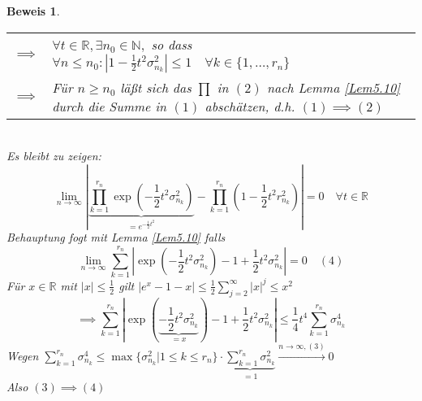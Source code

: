 \documentclass[a4paper,11pt]{book}
\newcommand{\R}{{\mathbb R}}
\newcommand{\N}{{\mathbb N}}
\def\folgt{\ensuremath{\implies}}
\theoremstyle{nonumberplain}
\newtheorem{Bew}{Beweis}
\begin{document}
\begin{Bew}
\begin{tabular}[b]{rp{}}
$\folgt$ & $\forall t\in\R, \exists n_0\in\N,$ so dass $\forall n\le n_0: |1-\frac 1 2 t^2\sigma_{n_k}^2|\le 1\quad \forall k\in\{1,\ldots, r_n\}$\\
$\folgt$ & Für $n\ge n_0$ läßt sich das $\prod$ in $(2)$ nach Lemma \ref{Lem5.10} durch die Summe in $(1)$ abschätzen, d.h. $(1)\folgt(2)$\\
\end{tabular}\\
Es bleibt zu zeigen:
$$\lim_{n\to\infty}|\underbrace{\prod_{k=1}^{r_n}\exp(-\frac 1 2 t^2\sigma_{n_k}^2)}_{=e^{-\frac 1 2 t^2}} - \prod_{k=1}^{r_n}(1-\frac 1 2 t^2 r_{n_k}^2)| = 0 \quad\forall t\in\R$$
Behauptung fogt mit Lemma \ref{Lem5.10} falls
$$\lim_{n\to\infty}\sum_{k=1}^{r_n}\left|\exp(-\frac 1 2 t^2\sigma_{n_k}^2) - 1 + \frac 1 2 t^2\sigma_{n_k}^2\right| = 0\quad (4)$$
Für $x\in\R$ mit $|x|\le\frac 1 2$ gilt $|e^x-1-x|\le\frac 1 2 \sum_{j=2}^\infty |x|^j\le x^2$
$$\folgt \sum_{k=1}^{r_n}|\exp(\underbrace{-\frac 1 2 t^2\sigma_{n_k}^2}_{=x}) - 1 + \frac 1 2 t^2\sigma_{n_k}^2|\le \frac 1 4 t^4\sum_{k=1}^{r_n}\sigma_{n_k}^4$$
Wegen $\sum_{k=1}^{r_n}\sigma_{n_k}^4\le\max\{\sigma_{n_k}^2|1\le k\le r_n\} \cdot\underbrace{\sum_{k=1}^{r_n}\sigma_{n_k}^2}_{=1}\stackrel{n\to\infty, (3)}{\to}0$\\
Also $(3)\folgt(4)$
\end{Bew}
\end{document}
